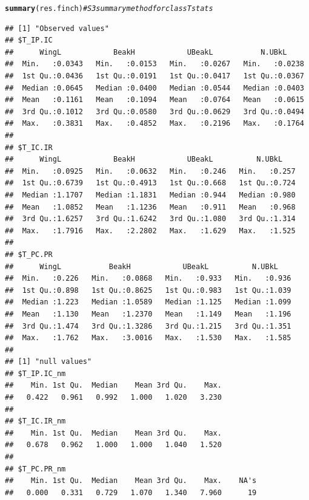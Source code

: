\documentclass[12pt]{article}\usepackage[]{graphicx}\usepackage[]{color}
\makeatletter
\newcommand{\hlcom}[1]{\textcolor[rgb]{0.678,0.584,0.686}{\textit{#1}}}%
\newcommand{\hlstd}[1]{\textcolor[rgb]{0.345,0.345,0.345}{#1}}%
\newcommand{\hlkwd}[1]{\textcolor[rgb]{0.737,0.353,0.396}{\textbf{#1}}}%
\newenvironment{kframe}{%
 \def\at@end@of@kframe{}%
 \ifinner\ifhmode%
  \def\at@end@of@kframe{\end{minipage}}%
  \begin{minipage}{\columnwidth}%
 \fi\fi%
 \def\FrameCommand##1{\hskip\@totalleftmargin \hskip-\fboxsep
 \colorbox{shadecolor}{##1}\hskip-\fboxsep
     \hskip-\linewidth \hskip-\@totalleftmargin \hskip\columnwidth}%
 \MakeFramed {\advance\hsize-\width
   \@totalleftmargin\z@ \linewidth\hsize
   \@setminipage}}%
 {\par\unskip\endMakeFramed%
 \at@end@of@kframe}
\newenvironment{knitrout}{}{} %
\makeatother
\begin{document}
\newpage

\begin{knitrout}
\color{fgcolor}\begin{kframe}
\begin{alltt}
\hlkwd{summary}\hlstd{(res.finch)} \hlcom{#S3 summary method for class Tstats}
\end{alltt}
\begin{verbatim}
## [1] "Observed values"
## $T_IP.IC
##      WingL            BeakH            UBeakL           N.UBkL      
##  Min.   :0.0343   Min.   :0.0153   Min.   :0.0267   Min.   :0.0238  
##  1st Qu.:0.0436   1st Qu.:0.0191   1st Qu.:0.0417   1st Qu.:0.0367  
##  Median :0.0645   Median :0.0400   Median :0.0544   Median :0.0403  
##  Mean   :0.1161   Mean   :0.1094   Mean   :0.0764   Mean   :0.0615  
##  3rd Qu.:0.1012   3rd Qu.:0.0580   3rd Qu.:0.0629   3rd Qu.:0.0494  
##  Max.   :0.3831   Max.   :0.4852   Max.   :0.2196   Max.   :0.1764  
## 
## $T_IC.IR
##      WingL            BeakH            UBeakL          N.UBkL     
##  Min.   :0.0925   Min.   :0.0632   Min.   :0.246   Min.   :0.257  
##  1st Qu.:0.6739   1st Qu.:0.4913   1st Qu.:0.668   1st Qu.:0.724  
##  Median :1.1707   Median :1.1831   Median :0.944   Median :0.980  
##  Mean   :1.0852   Mean   :1.1236   Mean   :0.911   Mean   :0.968  
##  3rd Qu.:1.6257   3rd Qu.:1.6242   3rd Qu.:1.080   3rd Qu.:1.314  
##  Max.   :1.7916   Max.   :2.2802   Max.   :1.629   Max.   :1.525  
## 
## $T_PC.PR
##      WingL           BeakH            UBeakL          N.UBkL     
##  Min.   :0.226   Min.   :0.0868   Min.   :0.933   Min.   :0.936  
##  1st Qu.:0.898   1st Qu.:0.8625   1st Qu.:0.983   1st Qu.:1.039  
##  Median :1.223   Median :1.0589   Median :1.125   Median :1.099  
##  Mean   :1.130   Mean   :1.2370   Mean   :1.149   Mean   :1.196  
##  3rd Qu.:1.474   3rd Qu.:1.3286   3rd Qu.:1.215   3rd Qu.:1.351  
##  Max.   :1.762   Max.   :3.0016   Max.   :1.530   Max.   :1.585  
## 
## [1] "null values"
## $T_IP.IC_nm
##    Min. 1st Qu.  Median    Mean 3rd Qu.    Max. 
##   0.422   0.961   0.992   1.000   1.020   3.230 
## 
## $T_IC.IR_nm
##    Min. 1st Qu.  Median    Mean 3rd Qu.    Max. 
##   0.678   0.962   1.000   1.000   1.040   1.520 
## 
## $T_PC.PR_nm
##    Min. 1st Qu.  Median    Mean 3rd Qu.    Max.    NA's 
##   0.000   0.331   0.729   1.070   1.340   7.960      19
\end{verbatim}
\end{kframe}
\end{knitrout}
\end{document}
